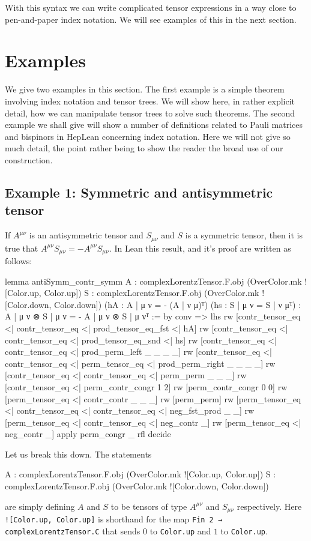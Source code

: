 \documentclass[a4paper, 11pt]{article}
\DeclareRobustCommand{\myinline}{\lstinline}
\begin{document}
With this syntax we can write complicated tensor expressions in a way close to pen-and-paper index notation. 
We will see examples of this in the next section.

\section{Examples} \label{sec:examples}

We give two examples in this section. The first example is a simple theorem involving index notation and 
tensor trees. We will show here, in rather explicit detail, how we can manipulate tensor trees to solve 
such theorems. 
The second example we shall give will show a number of definitions related to Pauli matrices and bispinors in HepLean concerning index notation.
Here we will not give so much detail, the point rather being to show the reader the broad use of our 
construction. 

\subsection{Example 1: Symmetric and antisymmetric tensor} \label{sec:exampleSymmAntiSymm}
If $A^{\mu \nu}$ is an antisymmetric tensor and $S_{\mu \nu}$ and $S$ is a symmetric tensor, then
it is true that $A^{\mu \nu} S_{\mu \nu} = - A^{\mu \nu} S_{\mu \nu}$. In Lean this result, and 
it's proof are written as follows: 
\begin{code}
lemma antiSymm_contr_symm 
    {A : complexLorentzTensor.F.obj (OverColor.mk ![Color.up, Color.up])}
    {S : complexLorentzTensor.F.obj (OverColor.mk ![Color.down, Color.down])}
    (hA : {A | μ ν = - (A | ν μ)}ᵀ) (hs : {S | μ ν = S | ν μ}ᵀ) :
    {A | μ ν ⊗ S | μ ν = - A | μ ν ⊗ S | μ ν}ᵀ := by
  conv =>
    lhs
    rw [contr_tensor_eq <| contr_tensor_eq <| prod_tensor_eq_fst <| hA]
    rw [contr_tensor_eq <| contr_tensor_eq <| prod_tensor_eq_snd <| hs]
    rw [contr_tensor_eq <| contr_tensor_eq <| prod_perm_left _ _ _ _]
    rw [contr_tensor_eq <| contr_tensor_eq <| perm_tensor_eq <| prod_perm_right _ _ _ _]
    rw [contr_tensor_eq <| contr_tensor_eq <| perm_perm _ _ _]
    rw [contr_tensor_eq <| perm_contr_congr 1 2]
    rw [perm_contr_congr 0 0]
    rw [perm_tensor_eq <| contr_contr _ _ _]
    rw [perm_perm]
    rw [perm_tensor_eq <| contr_tensor_eq <| contr_tensor_eq <| neg_fst_prod _ _]
    rw [perm_tensor_eq <| contr_tensor_eq <| neg_contr _]
    rw [perm_tensor_eq <| neg_contr _]
  apply perm_congr _ rfl
  decide
\end{code}
Let us break this down. The statements 
\begin{code} 
{A : complexLorentzTensor.F.obj (OverColor.mk ![Color.up, Color.up])}
{S : complexLorentzTensor.F.obj (OverColor.mk ![Color.down, Color.down])}
\end{code}
are simply defining $A$ and $S$ to be tensors of type $A^{\mu \nu}$ and $S_{\mu \nu}$ respectively.
Here \myinline|![Color.up, Color.up]| is shorthand for the map \myinline|Fin 2 → complexLorentzTensor.C| that sends
$0$ to \myinline|Color.up| and $1$ to \myinline|Color.up|.
\end{document}
